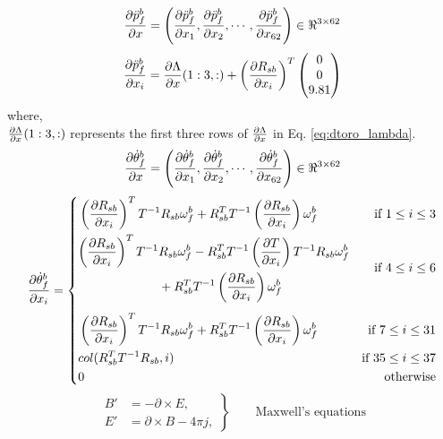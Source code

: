  \begin{equation}
 \label{eq:dmsr_dacc}
 \frac{\partial {\ddot{p}_{f}^{b}}}{\partial {x}} = \left( \frac{\partial {\ddot{p}_{f}^{b}}}{\partial {x_{1}}},\frac{\partial {\ddot{p}_{f}^{b}}}{\partial {x_{2}}}, \cdots , \frac{\partial {\ddot{p}_{f}^{b}}}{\partial {x_{62}}} \right) \in \Re^{3 \times 62}
 \end{equation}
 $$ \frac{\partial {\ddot{p}_{f}^{b}}}{\partial {x_{i}}} = \frac{\partial {\Lambda}}{\partial {x}}(1:3,:) + \left(\frac{\partial {R_{sb}}}{\partial {x_{i}}}\right)^{T}
 \begin{pmatrix}
 0 \\ 0 \\ 9.81
 \end{pmatrix}$$
where,\\
$\frac{\partial {\Lambda}}{\partial {x}}(1:3,:)$ represents the first three rows of $\frac{\partial {\Lambda}}{\partial {x}}$ in Eq. \ref{eq:dtoro_lambda}.
\begin{equation}
\label{eq:dmsr_dtheta}
\frac{\partial {\dot{\theta}_{f}^{b}}}{\partial {x}} = \left(\frac{\partial {\dot{\theta}_{f}^{b}}}{\partial {x_{1}}}, \frac{\partial {\dot{\theta}_{f}^{b}}}{\partial {x_{2}}}, \cdots , \frac{\partial {\dot{\theta}_{f}^{b}}}{\partial {x_{62}}} \right) \in \Re^{3 \times 62}
\end{equation}
\[
\dfdx{\dot{\theta}_{f}^{b}}{x_{i}} = 
\left\{ 
\!\begin{aligned}
&\left(\dfdx{R_{sb}}{x_{i}}\right)^{T}T^{-1}R_{sb} \omega_{f}^{b}+ R_{sb} ^{T}T^{-1} \left(\dfdx{R_{sb}}{x_{i}}\right)\omega_{f}^{b} & \text{if } 1 \leq i \leq 3 \\
&\!\begin{aligned}%
	\left(\dfdx{R_{sb}}{x_{i}}\right)^{T}T^{-1} & R_{sb} \omega_{f}^{b} - R_{sb} ^{T}T^{-1} \left(\dfdx{T}{x_{i}}\right)T^{-1}R_{sb} \omega_{f}^{b} \\
	 & + R_{sb} ^{T}T^{-1} \left(\dfdx{R_{sb}}{x_{i}}\right)\omega_{f}^{b}
    \end{aligned}       & \text{if } 4 \leq i \leq 6 \\[1ex]
&\left(\dfdx{R_{sb}}{x_{i}}\right)^{T}T^{-1}R_{sb} \omega_{f}^{b}+ R_{sb} ^{T}T^{-1} \left(\dfdx{R_{sb}}{x_{i}}\right)\omega_{f}^{b} & \text{if } 7 \leq i \leq 31 \\
&col(R_{sb}^{T}T^{-1}R_{sb},i) & \text{if } 35 \leq i \leq 37 \\
&0 & \text{ otherwise} 
\end{aligned}
\right.
\]
\begin{equation*}
\left.\begin{aligned}
B'&=-\partial\times E,\\
E'&=\partial\times B - 4\pi j,
\end{aligned}
\right\}
\qquad \text{Maxwell's equations}
\end{equation*}
